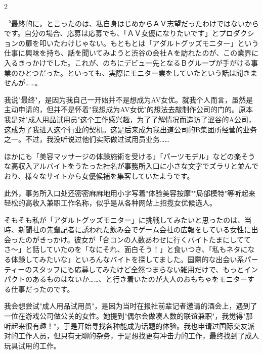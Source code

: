 \documentclass[12pt,UTF8]{ctexbook}
\begin{document}
\begin{paracol}{2}

〝最終的に〟と言ったのは、私自身はじめからＡＶ志望だったわけではないからです。自分の場合、応募は応募でも、「ＡＶ女優になりたいです」とプロダクションの扉を叩いたわけじゃない。もともとは「アダルトグッズモニター」という仕事に興味を持ち、話を聞いてみようと渋谷の会社Ａを訪れたのが、この業界に入るきっかけでした。これが、のちにデビュー先となるＢグループが手がける事業のひとつだった。といっても、実際にモニター業をしていたという話は聞きませんが……。

\switchcolumn

我说"最终"，是因为我自己一开始并不是想成为AV女优。就我个人而言，虽然是主动申请的，但并不是怀着"我想成为AV女优"的想法去敲制作公司的门的。原本我是对"成人用品试用员"这个工作感兴趣，为了了解情况而造访了涩谷的A公司，这成为了我进入这个行业的契机。这是后来成为我出道公司的B集团所经营的业务之一。不过，我没听说过他们实际做过试用员业务……

\switchcolumn*

ほかにも「美容マッサージの体験施術を受ける」「パーツモデル」などの楽そうな高収入アルバイトをうたった社名が事務所入口に小さな文字でズラリと並んでおり、様々なサイトから女優候補を集客していたようです。

\switchcolumn

此外，事务所入口处还密密麻麻地用小字写着"体验美容按摩""局部模特"等听起来轻松的高收入兼职工作名称，似乎是从各种网站上招揽女优候选人。

\switchcolumn*

そもそも私が「アダルトグッズモニター」に挑戦してみたいと思ったのは、当時、新聞社の先輩記者に誘われた飲み会でゲーム会社の広報をしている女性に出会ったのがきっかけ。彼女が「合コンの人数あわせに行くバイトたまにしててさ〜」と話していたのを「なにそれ、面白そう！」と食いつき、「私もネタになる体験してみたいな」といろんなバイトを探してました。国際的な出会い系パーティーのスタッフにも応募してみたけど全然つまらない雑用だけで、もっとインパクトのあるものはないか……、と行き着いたのが大人のおもちゃをモニターする仕事だったのです。

\switchcolumn

我会想尝试"成人用品试用员"，是因为当时在报社前辈记者邀请的酒会上，遇到了一位在游戏公司做公关的女性。她提到"偶尔会做凑人数的联谊兼职"，我觉得"那听起来很有趣！"，于是开始寻找各种能成为话题的体验。我也申请过国际交友派对的工作人员，但只有无聊的杂务，于是想找更有冲击力的工作，最终找到了成人玩具试用的工作。

\switchcolumn*


\end{paracol}
\end{document}
